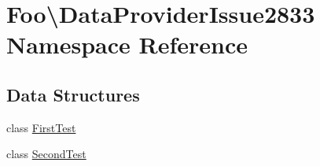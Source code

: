 \hypertarget{namespace_foo_1_1_data_provider_issue2833}{}\section{Foo\textbackslash{}Data\+Provider\+Issue2833 Namespace Reference}
\label{namespace_foo_1_1_data_provider_issue2833}
\subsection*{Data Structures}
\begin{DoxyCompactItemize}
\item 
class \mbox{\hyperlink{class_foo_1_1_data_provider_issue2833_1_1_first_test}{First\+Test}}
\item 
class \mbox{\hyperlink{class_foo_1_1_data_provider_issue2833_1_1_second_test}{Second\+Test}}
\end{DoxyCompactItemize}
